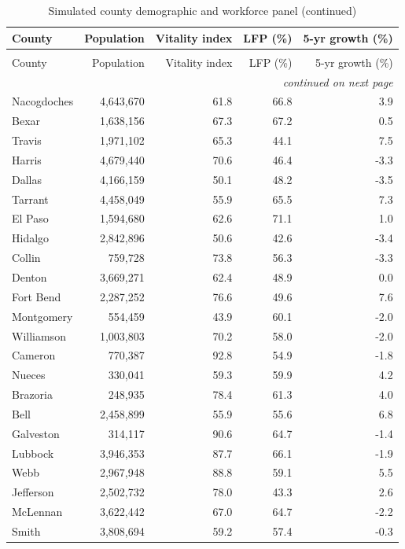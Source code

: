 \documentclass[11pt]{article}
\begin{document}
\begin{longtable}{lrrrr}
\caption{Simulated county demographic and workforce panel}\label{tab:countypanel}\\
\toprule
County & Population & Vitality index & LFP (\%) & 5-yr growth (\%) \\
\midrule
\endfirsthead
\caption[]{Simulated county demographic and workforce panel (continued)}\\
\toprule
County & Population & Vitality index & LFP (\%) & 5-yr growth (\%) \\
\midrule
\endhead
\midrule
\multicolumn{5}{r}{\emph{continued on next page}}\\
\endfoot
\bottomrule
\endlastfoot
Nacogdoches & 4,643,670 & 61.8 & 66.8 & 3.9 \\
Bexar & 1,638,156 & 67.3 & 67.2 & 0.5 \\
Travis & 1,971,102 & 65.3 & 44.1 & 7.5 \\
Harris & 4,679,440 & 70.6 & 46.4 & -3.3 \\
Dallas & 4,166,159 & 50.1 & 48.2 & -3.5 \\
Tarrant & 4,458,049 & 55.9 & 65.5 & 7.3 \\
El Paso & 1,594,680 & 62.6 & 71.1 & 1.0 \\
Hidalgo & 2,842,896 & 50.6 & 42.6 & -3.4 \\
Collin & 759,728 & 73.8 & 56.3 & -3.3 \\
Denton & 3,669,271 & 62.4 & 48.9 & 0.0 \\
Fort Bend & 2,287,252 & 76.6 & 49.6 & 7.6 \\
Montgomery & 554,459 & 43.9 & 60.1 & -2.0 \\
Williamson & 1,003,803 & 70.2 & 58.0 & -2.0 \\
Cameron & 770,387 & 92.8 & 54.9 & -1.8 \\
Nueces & 330,041 & 59.3 & 59.9 & 4.2 \\
Brazoria & 248,935 & 78.4 & 61.3 & 4.0 \\
Bell & 2,458,899 & 55.9 & 55.6 & 6.8 \\
Galveston & 314,117 & 90.6 & 64.7 & -1.4 \\
Lubbock & 3,946,353 & 87.7 & 66.1 & -1.9 \\
Webb & 2,967,948 & 88.8 & 59.1 & 5.5 \\
Jefferson & 2,502,732 & 78.0 & 43.3 & 2.6 \\
McLennan & 3,622,442 & 67.0 & 64.7 & -2.2 \\
Smith & 3,808,694 & 59.2 & 57.4 & -0.3 \\

\end{longtable}
\end{document}

